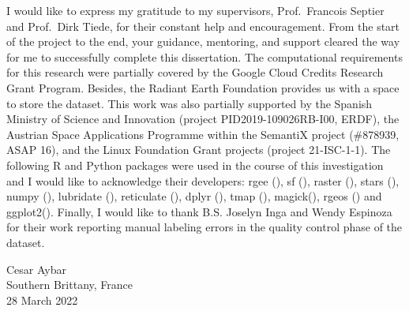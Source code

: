 \documentclass[a4paper, nobind]{templates/cdethesis}
\begin{document}
\begin{romanpages}
\begin{acknowledgements}
 	I would like to express my gratitude to my supervisors, Prof.~Francois Septier
  and Prof.~Dirk Tiede, for their constant help and encouragement. From the start
  of the project to the end, your guidance, mentoring, and support cleared the way
  for me to successfully complete this dissertation. The computational requirements
  for this research were partially covered by the Google Cloud Credits Research Grant Program. Besides,
  the Radiant Earth Foundation provides us with a space to store the dataset. This work
  was also partially supported by the Spanish Ministry of Science and Innovation
  (project PID2019-109026RB-I00, ERDF), the Austrian Space Applications Programme
  within the SemantiX project (\#878939, ASAP 16), and the Linux Foundation Grant
  projects (project 21-ISC-1-1). The following R and Python packages
  were used in the course of this investigation and I would like to acknowledge
  their developers: rgee (\cite{Aybar2020}), sf (\cite{Pebesma2018}),
  raster (\cite{hijmans2015package}), stars (\cite{pebesma2020stars}),
  numpy (\cite{harris2020array}), lubridate (\cite{grolemund2011dates}),
  reticulate (\cite{ushey2020reticulate}), dplyr (\cite{wickham2014dplyr}),
  tmap (\cite{tennekes2018tmap}), magick(\cite{ooms2020magick}),
  rgeos (\cite{bivand2017package}) and ggplot2(\cite{wickham2011ggplot2}). Finally,
  I would like to thank B.S. Joselyn Inga and Wendy Espinoza for their work
  reporting manual labeling errors in the quality control phase of the dataset.

  \begin{flushright}
  Cesar Aybar \\
  Southern Brittany, France \\
  28 March 2022
  \end{flushright}
\end{acknowledgements}


  \dominitoc %

\flushbottom

\tableofcontents


\end{romanpages}
\end{document}
